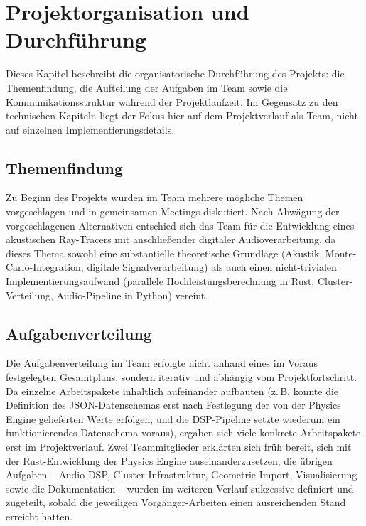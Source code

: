\documentclass{article}
\begin{document}
\section{Projektorganisation und Durchführung}
\label{sec:projektorganisation}
Dieses Kapitel beschreibt die organisatorische Durchführung des Projekts:
die Themenfindung, die Aufteilung der Aufgaben im Team sowie die
Kommunikationsstruktur während der Projektlaufzeit. Im Gegensatz zu den
technischen Kapiteln liegt der Fokus hier auf dem Projektverlauf als
Team, nicht auf einzelnen Implementierungsdetails.

\subsection{Themenfindung}
\label{sec:themenfindung}
Zu Beginn des Projekts wurden im Team mehrere mögliche Themen
vorgeschlagen und in gemeinsamen Meetings diskutiert. Nach Abwägung der vorgeschlagenen 
Alternativen entschied sich das Team für die Entwicklung eines akustischen Ray-Tracers mit 
anschließender digitaler Audioverarbeitung, da dieses Thema sowohl eine substantielle theoretische 
Grundlage (Akustik, Monte-Carlo-Integration,
digitale Signalverarbeitung) als auch einen nicht-trivialen
Implementierungsaufwand (parallele Hochleistungsberechnung in Rust,
Cluster-Verteilung, Audio-Pipeline in Python) vereint.

\subsection{Aufgabenverteilung}
\label{sec:aufgabenverteilung}
Die Aufgabenverteilung im Team erfolgte nicht anhand eines im Voraus
festgelegten Gesamtplans, sondern iterativ und abhängig vom
Projektfortschritt. Da einzelne Arbeitspakete inhaltlich aufeinander
aufbauten (z.\,B. konnte die Definition des JSON-Datenschemas erst nach
Festlegung der von der Physics Engine gelieferten Werte erfolgen, und die
DSP-Pipeline setzte wiederum ein funktionierendes Datenschema voraus),
ergaben sich viele konkrete Arbeitspakete erst im Projektverlauf. Zwei
Teammitglieder erklärten sich früh bereit, sich mit der Rust-Entwicklung
der Physics Engine auseinanderzusetzen; die übrigen Aufgaben -- Audio-DSP,
Cluster-Infrastruktur, Geometrie-Import, Visualisierung sowie die
Dokumentation -- wurden im weiteren Verlauf sukzessive definiert und
zugeteilt, sobald die jeweiligen Vorgänger-Arbeiten einen ausreichenden
Stand erreicht hatten.
\end{document}

